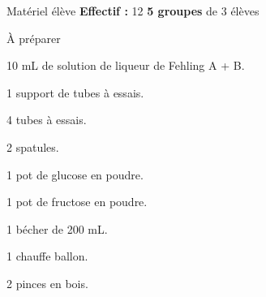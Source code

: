 
\begin{boiteMateriel}{Matériel élève}
  \textbf{Effectif :} 12
  \qq{}\qq{}
  \flecheLongue \textbf{5 groupes} de 3 élèves
\end{boiteMateriel}


\begin{boiteMateriel}{À préparer}
  \begin{protocole}
    \item 10 mL de solution de liqueur de Fehling A + B.
    \item 1 support de tubes à essais.
    \item 4 tubes à essais.
    \item 2 spatules.
    \item 1 pot de glucose en poudre.
    \item 1 pot de fructose en poudre.
    \item 1 bécher de 200 mL.
    \item 1 chauffe ballon.
    \item 2 pinces en bois.
  \end{protocole}
\end{boiteMateriel}